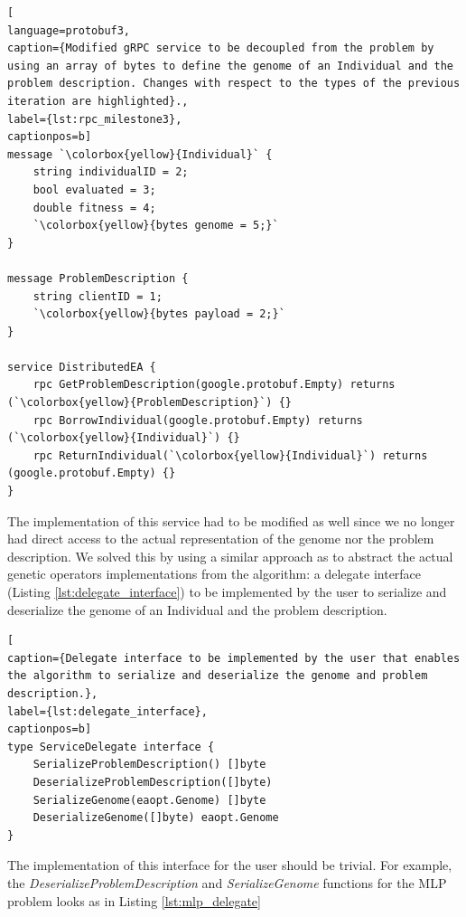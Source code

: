 \begin{lstlisting}[
language=protobuf3,
caption={Modified gRPC service to be decoupled from the problem by using an array of bytes to define the genome of an Individual and the problem description. Changes with respect to the types of the previous iteration are highlighted}.,
label={lst:rpc_milestone3},
captionpos=b]
message `\colorbox{yellow}{Individual}` {
    string individualID = 2;
    bool evaluated = 3;
    double fitness = 4;
    `\colorbox{yellow}{bytes genome = 5;}`
}

message ProblemDescription {
    string clientID = 1;
    `\colorbox{yellow}{bytes payload = 2;}`
}

service DistributedEA {
    rpc GetProblemDescription(google.protobuf.Empty) returns (`\colorbox{yellow}{ProblemDescription}`) {}
    rpc BorrowIndividual(google.protobuf.Empty) returns (`\colorbox{yellow}{Individual}`) {}
    rpc ReturnIndividual(`\colorbox{yellow}{Individual}`) returns (google.protobuf.Empty) {}
}
\end{lstlisting}

The implementation of this service had to be modified as well since we no longer had direct access to the actual representation of the genome nor the problem description. We solved this by using a similar approach as to abstract the actual genetic operators implementations from the algorithm: a delegate interface (Listing \ref{lst:delegate_interface}) to be implemented by the user to serialize and deserialize the genome of an Individual and the problem description.

\begin{lstlisting}[
caption={Delegate interface to be implemented by the user that enables the algorithm to serialize and deserialize the genome and problem description.},
label={lst:delegate_interface},
captionpos=b]
type ServiceDelegate interface {
	SerializeProblemDescription() []byte
	DeserializeProblemDescription([]byte)
	SerializeGenome(eaopt.Genome) []byte
	DeserializeGenome([]byte) eaopt.Genome
}
\end{lstlisting}

The implementation of this interface for the user should be trivial. For example, the \textit{DeserializeProblemDescription} and \textit{SerializeGenome} functions for the MLP problem looks as in Listing \ref{lst:mlp_delegate}

